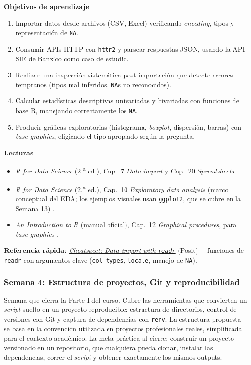 \documentclass[11pt,letterpaper]{article}
\newcommand{\blue}[1]{{\color{cerulean}#1}}
\newcommand{\semana}[2]{%
  \subsubsection*{\color{main}Semana #1: #2}%
}
\newcommand{\cheatsheet}[2]{%
  \href{https://rstudio.github.io/cheatsheets/#1.pdf}{\textit{Cheatsheet: #2}}%
}
\begin{document}
\medskip
\noindent\textbf{Objetivos de aprendizaje}
\begin{enumerate}[leftmargin=*, itemsep=1pt]
    \item Importar datos desde archivos (CSV, Excel) verificando \textit{encoding}, tipos y representación de \texttt{NA}.
    \item Consumir APIs HTTP con \texttt{httr2} y parsear respuestas JSON, usando la API SIE de Banxico como caso de estudio.
    \item Realizar una inspección sistemática post-importación que detecte errores tempranos (tipos mal inferidos, \texttt{NA}s no reconocidos).
    \item Calcular estadísticas descriptivas univariadas y bivariadas con funciones de base R, manejando correctamente los \texttt{NA}.
    \item Producir gráficas exploratorias (histograma, \textit{boxplot}, dispersión, barras) con \textit{base graphics}, eligiendo el tipo apropiado según la pregunta.
\end{enumerate}

\medskip
\noindent\textbf{Lecturas}
\begin{itemize}[leftmargin=*, itemsep=1pt]
    \item \textit{R for Data Science} (2.\textsuperscript{a} ed.), Cap.\ 7 \textit{Data import} y Cap.\ 20 \textit{Spreadsheets} \cite{wickham2023r4ds}.
    \item \textit{R for Data Science} (2.\textsuperscript{a} ed.), Cap.\ 10 \textit{Exploratory data analysis} (marco conceptual del EDA; los ejemplos visuales usan \texttt{ggplot2}, que se cubre en la Semana 13) \cite{wickham2023r4ds}.
    \item \textit{An Introduction to R} (manual oficial), Cap.\ 12 \textit{Graphical procedures}, para \textit{base graphics} \cite{rcoreteam-intro}.
\end{itemize}

\medskip
\noindent\textbf{Referencia rápida:} \cheatsheet{data-import}{Data import with \texttt{readr}} (Posit) ---funciones de \texttt{readr} con argumentos clave (\texttt{col\_types}, \texttt{locale}, manejo de \texttt{NA}).

\semana{4}{Estructura de proyectos, Git y reproducibilidad}

Semana que cierra la Parte I del curso. Cubre las herramientas que convierten un \textit{script} suelto en un proyecto reproducible: estructura de directorios, control de versiones con Git y captura de dependencias con \texttt{renv}. La estructura propuesta se basa en la \blue{convención utilizada en proyectos profesionales reales}, simplificada para el contexto académico. La meta práctica al cierre: construir un proyecto versionado en un repositorio, que cualquiera pueda clonar, instalar las dependencias, correr el \textit{script} y obtener exactamente los mismos outputs.
\end{document}
